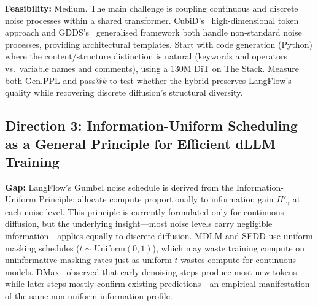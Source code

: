 \documentclass[11pt]{article}
\begin{document}
\textbf{Feasibility:} Medium. The main challenge is coupling continuous and discrete noise processes within a shared transformer. CubiD's~\cite{cubid} high-dimensional token approach and GDDS's~\cite{gdds} generalised framework both handle non-standard noise processes, providing architectural templates. Start with code generation (Python) where the content/structure distinction is natural (keywords and operators vs.\ variable names and comments), using a 130M DiT on The Stack. Measure both Gen.PPL and pass@$k$ to test whether the hybrid preserves LangFlow's quality while recovering discrete diffusion's structural diversity.

\subsection{Direction 3: Information-Uniform Scheduling as a General Principle for Efficient dLLM Training}

\textbf{Gap:} LangFlow's Gumbel noise schedule is derived from the Information-Uniform Principle: allocate compute proportionally to information gain $H'_\gamma$ at each noise level. This principle is currently formulated only for continuous diffusion, but the underlying insight---most noise levels carry negligible information---applies equally to discrete diffusion. MDLM and SEDD use uniform masking schedules ($t \sim \mathrm{Uniform}(0,1)$), which may waste training compute on uninformative masking rates just as uniform $t$ wastes compute for continuous models. DMax~\cite{dmax} observed that early denoising steps produce most new tokens while later steps mostly confirm existing predictions---an empirical manifestation of the same non-uniform information profile.
\end{document}
